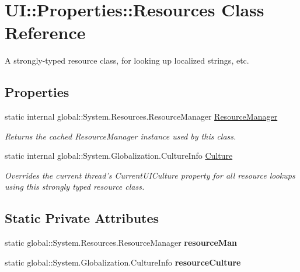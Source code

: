 \hypertarget{class_u_i_1_1_properties_1_1_resources}{
\section{UI::Properties::Resources Class Reference}
\label{class_u_i_1_1_properties_1_1_resources}
}


A strongly-\/typed resource class, for looking up localized strings, etc.  
\subsection*{Properties}
\begin{DoxyCompactItemize}
\item 
static internal global::System.Resources.ResourceManager \hyperlink{class_u_i_1_1_properties_1_1_resources_a8766fbe41ebf10ebf9984cbe9e4ad7f9}{ResourceManager}
\begin{DoxyCompactList}\small\item\em Returns the cached ResourceManager instance used by this class. \item\end{DoxyCompactList}\item 
static internal global::System.Globalization.CultureInfo \hyperlink{class_u_i_1_1_properties_1_1_resources_a46a0e9bbbbdb0717d4a25428483b2728}{Culture}
\begin{DoxyCompactList}\small\item\em Overrides the current thread's CurrentUICulture property for all resource lookups using this strongly typed resource class. \item\end{DoxyCompactList}\end{DoxyCompactItemize}
\subsection*{Static Private Attributes}
\begin{DoxyCompactItemize}
\item 
\hypertarget{class_u_i_1_1_properties_1_1_resources_a4d67fb5a56b27ed527034330f5614de9}{
static global::System.Resources.ResourceManager {\bfseries resourceMan}}
\label{class_u_i_1_1_properties_1_1_resources_a4d67fb5a56b27ed527034330f5614de9}

\item 
\hypertarget{class_u_i_1_1_properties_1_1_resources_a25149ec96c68564c38c6537b958f98bc}{
static global::System.Globalization.CultureInfo {\bfseries resourceCulture}}
\label{class_u_i_1_1_properties_1_1_resources_a25149ec96c68564c38c6537b958f98bc}

\end{DoxyCompactItemize}


